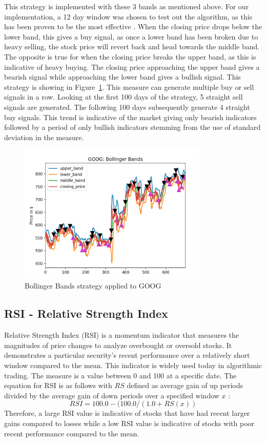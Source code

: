 \documentclass[letterpaper,11pt]{article}
\begin{document}
This strategy is implemented with these 3 bands as mentioned above. For our implementation, a 12 day window was chosen to test out the algorithm, as this has been proven to be the most effective \cite{Liu2006}. When the closing price drops below the lower band, this gives a buy signal, as once a lower band has been broken due to heavy selling, the stock price will revert back and head towards the middle band. The opposite is true for when the closing price breaks the upper band, as this is indicative of heavy buying. The closing price approaching the upper band gives a bearish signal while approaching the lower band gives a bullish signal.  This strategy is showing in Figure~\ref{BBANDSfigure}. This measure can generate multiple buy or sell signals in a row. Looking at the first 100 days of the strategy, 5 straight sell signals are generated. The following 100 days subsequently generate 4 straight buy signals. This trend is indicative of the market giving only bearish indicators followed by a period of only bullish indicators stemming from the use of standard deviation in the measure.

\begin{figure}[h]
\centering
\includegraphics[width=90mm]{Goog_Bbands.png}
\caption{Bollinger Bands strategy applied to GOOG  \label{overflow}}
\label{BBANDSfigure}
\end{figure}

\subsection{RSI - Relative Strength Index}

Relative Strength Index (RSI) is a momentum indicator that measures the magnitudes of price changes to analyze overbought or oversold stocks. It demonstrates a particular security's recent performance over a relatively short window compared to the mean. This indicator is widely used today in algorithmic trading. The measure is a value between 0 and 100 at a specific date. The equation for RSI is as follows with $RS$ defined as average gain of up periods divided by the average gain of down periods over a specified window $x$ \cite{Chong2014}: \[RSI = 100.0 - (100.0 / (1.0 + RS(x))\] Therefore, a large RSI value is indicative of stocks that have had recent larger gains compared to losses while a low RSI value is indicative of stocks with poor recent performance compared to the mean.
\end{document}

